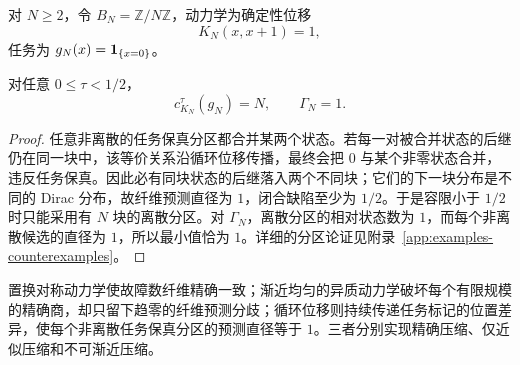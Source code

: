 对 $N\ge2$，令 $B_N=\mathbb Z/N\mathbb Z$，动力学为确定性位移
\[
K_N(x,x+1)=1,
\]
任务为 $g_N(x)=\mathbf 1_{\{x=0\}}$。

\begin{proposition}[循环链的微观尺度下界]
\label{prop:cycle-obstruction}
对任意 $0\le\tau<1/2$，
\[
c_{K_N}^{\tau}(g_N)=N,
\qquad
\Gamma_N=1.
\]
\end{proposition}

\begin{proof}
任意非离散的任务保真分区都合并某两个状态。若每一对被合并状态的后继仍在同一块中，该等价关系沿循环位移传播，最终会把 $0$ 与某个非零状态合并，违反任务保真。因此必有同块状态的后继落入两个不同块；它们的下一块分布是不同的 Dirac 分布，故纤维预测直径为 $1$，闭合缺陷至少为 $1/2$。于是容限小于 $1/2$ 时只能采用有 $N$ 块的离散分区。对 $\Gamma_N$，离散分区的相对状态数为 $1$，而每个非离散候选的直径为 $1$，所以最小值恰为 $1$。详细的分区论证见附录~\ref{app:examples-counterexamples}。
\end{proof}

置换对称动力学使故障数纤维精确一致；渐近均匀的异质动力学破坏每个有限规模的精确商，却只留下趋零的纤维预测分歧；循环位移则持续传递任务标记的位置差异，使每个非离散任务保真分区的预测直径等于 $1$。三者分别实现精确压缩、仅近似压缩和不可渐近压缩。
